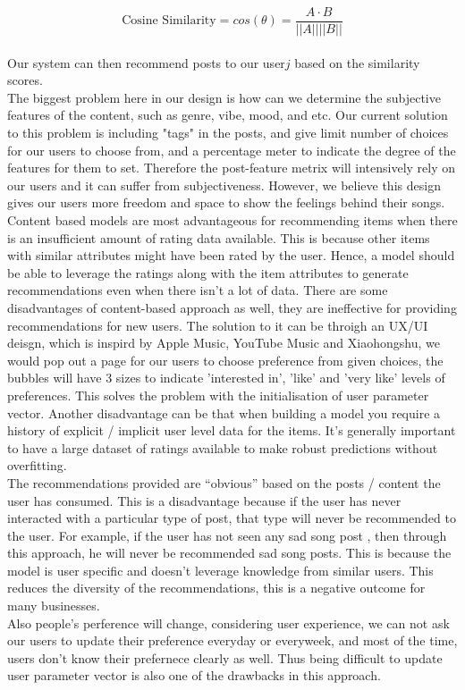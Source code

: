\begin{equation*}
\text{Cosine Similarity} = cos(\theta) = \frac{A \cdot B}{||A|| ||B||}
\end{equation*}
\\Our system can then recommend posts to our user$j$ based on the similarity scores.
\\The biggest problem here in our design is how can we determine the subjective features of the content, such as genre, vibe, mood, and etc. Our current solution to this problem is including "tags" in the posts, and give limit number of choices for our users to choose from, 
and a percentage meter to indicate the degree of the features for them to set. Therefore the post-feature metrix will intensively rely on our users and it can suffer from subjectiveness.
However, we believe this design gives our users more freedom and space to show the feelings behind their songs.
\\Content based models are most advantageous for recommending items when there is an insufficient amount of rating data available. This is because other items with similar attributes might have been rated by the user. Hence, a model should be able to leverage the ratings along with the item attributes to generate recommendations even when there isn’t a lot of data.
There are some disadvantages of content-based approach as well, they are ineffective for providing recommendations for new users. 
The solution to it can be throigh an UX/UI deisgn, which is inspird by Apple Music, YouTube Music and Xiaohongshu, we would pop out a page for our users to choose preference from given choices, the bubbles will have 3 sizes to indicate 'interested in', 'like' and 'very like' levels of preferences. 
This solves the problem with the initialisation of user parameter vector. 
Another disadvantage can be that when building a model you require a history of explicit / implicit user level data for the items. It’s generally important to have a large dataset of ratings available to make robust predictions without overfitting.
\\The recommendations provided are “obvious” based on the posts / content the user has consumed. This is a disadvantage because if the user has never interacted with a particular type of post, that type will never be recommended to the user. 
For example, if the user has not seen any sad song post , then through this approach, he will never be recommended sad song posts. This is because the model is user specific and doesn’t leverage knowledge from similar users. This reduces the diversity of the recommendations, this is a negative outcome for many businesses.
\\Also people's perference will change, considering user experience, we can not ask our users to update their preference everyday or everyweek, 
and most of the time, users don't know their prefernece clearly as well. Thus being difficult to update user parameter vector is also one of the drawbacks in this approach.

